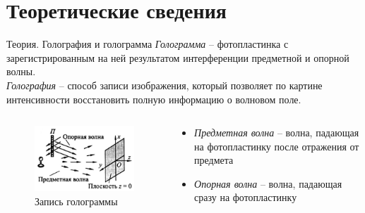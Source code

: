 \documentclass[11pt]{beamer} %
\begin{document}
    \section{Теоретические сведения}

   \begin{frame}{Теория. Голография и голограмма}
            \textit{Голограмма} -- фотопластинка с зарегистрированным на ней результатом интерференции предметной и опорной волны. \\
            \textit{Голография} -- способ записи изображения, который позволяет по картине интенсивности восстановить полную информацию о волновом поле. 
        \begin{columns}[T]
            \begin{column}{0.5\textwidth}
                \centering
                \begin{figure}
                    \includegraphics[width=\textwidth]{images/hologram_holography.jpg}
                    \caption{Запись голограммы}
                    \label{hol_hol}
                \end{figure}
            \end{column}
    
            \begin{column}{0.5\textwidth}
                \begin{itemize}
                    \item \textit{Предметная волна} -- волна, падающая на фотопластинку после отражения от предмета
                    \item \textit{Опорная волна} -- волна, падающая сразу на фотопластинку
                \end{itemize}
            \end{column}
        \end{columns}       
   \end{frame}
\end{document}
